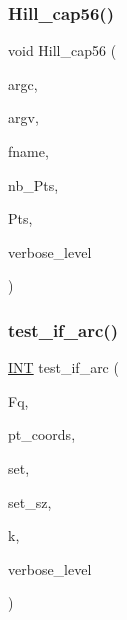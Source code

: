 \subsubsection{\texorpdfstring{Hill\+\_\+cap56()}{Hill\_cap56()}}
{\footnotesize\ttfamily void Hill\+\_\+cap56 (\begin{DoxyParamCaption}\item[{int}]{argc,  }\item[{const char $\ast$$\ast$}]{argv,  }\item[{\mbox{\hyperlink{galois_8h_ab6cc7b4aeb6ea31aba2b3fbfc83ff5e6}{B\+Y\+TE}} $\ast$}]{fname,  }\item[{\mbox{\hyperlink{galois_8h_a09fddde158a3a20bd2dcadb609de11dc}{I\+NT}} \&}]{nb\+\_\+\+Pts,  }\item[{\mbox{\hyperlink{galois_8h_a09fddde158a3a20bd2dcadb609de11dc}{I\+NT}} $\ast$\&}]{Pts,  }\item[{\mbox{\hyperlink{galois_8h_a09fddde158a3a20bd2dcadb609de11dc}{I\+NT}}}]{verbose\+\_\+level }\end{DoxyParamCaption})}

\mbox{\label{_t_o_p___l_e_v_e_l_2projective__space_8_c_a3601e3ab7b739f8a11e6ec0aaf194593}} 
\subsubsection{\texorpdfstring{test\+\_\+if\+\_\+arc()}{test\_if\_arc()}}
{\footnotesize\ttfamily \mbox{\hyperlink{galois_8h_a09fddde158a3a20bd2dcadb609de11dc}{I\+NT}} test\+\_\+if\+\_\+arc (\begin{DoxyParamCaption}\item[{\mbox{\hyperlink{classfinite__field}{finite\+\_\+field}} $\ast$}]{Fq,  }\item[{\mbox{\hyperlink{galois_8h_a09fddde158a3a20bd2dcadb609de11dc}{I\+NT}} $\ast$}]{pt\+\_\+coords,  }\item[{\mbox{\hyperlink{galois_8h_a09fddde158a3a20bd2dcadb609de11dc}{I\+NT}} $\ast$}]{set,  }\item[{\mbox{\hyperlink{galois_8h_a09fddde158a3a20bd2dcadb609de11dc}{I\+NT}}}]{set\+\_\+sz,  }\item[{\mbox{\hyperlink{galois_8h_a09fddde158a3a20bd2dcadb609de11dc}{I\+NT}}}]{k,  }\item[{\mbox{\hyperlink{galois_8h_a09fddde158a3a20bd2dcadb609de11dc}{I\+NT}}}]{verbose\+\_\+level }\end{DoxyParamCaption})}


